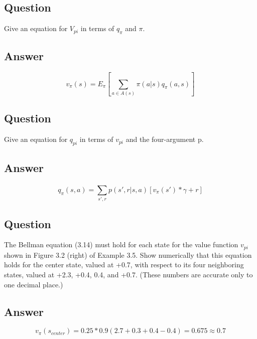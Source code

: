 \documentclass[11pt]{article}
\begin{document}
    \subsection{Question}

    Give an equation for $V_{pi}$ in terms of $q_\pi$ and $\pi$.

    \subsection*{Answer}

    \begin{equation}
        v_{\pi}(s) = E_{\pi}[\sum_{a \in A(s)}^{} \pi(a|s)q_{\pi}(a,s)]
    \end{equation}

    \subsection{Question}

    Give an equation for $q_{pi}$ in terms of $v_{pi}$ and the four-argument p.

    \subsection*{Answer}

    \begin{equation}
        q_{\pi}(s, a) = \sum_{s',r}^{} p(s', r | s, a) [v_{\pi}(s')*\gamma + r ]
    \end{equation}

    \subsection{Question}

    The Bellman equation (3.14) must hold for each state for the value function $v_{pi}$ shown in Figure 3.2 (right) of Example 3.5.
    Show numerically that this equation holds for the center state, valued at +0.7, with respect to its four neighboring states, valued at +2.3, +0.4, 0.4, and +0.7.
    (These numbers are accurate only to one decimal place.)

    \subsection*{Answer}

    \begin{equation}
        v_{\pi}(s_{center}) = 0.25 * 0.9 ( 2.7 + 0.3 + 0.4 -0.4 ) = 0.675 \approx 0.7
    \end{equation}
\end{document}
